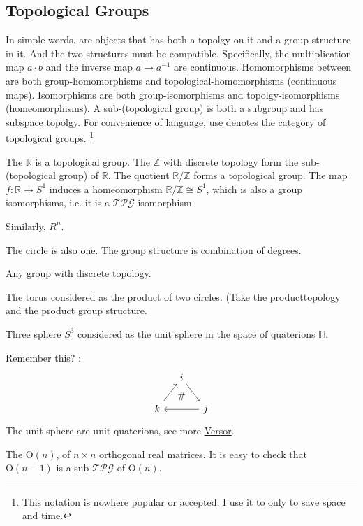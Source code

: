 \subsection{Topological Groups}
\label{sec:Topological-Groups}

In simple words,  are objects that has both
a topolgy on it and a group structure in it. And the two structures
must be compatible. Specifically, the multiplication map $a\cdot b$
and the inverse map $a\to a^{-1}$ are continuous. Homomorphisms
between are both group-homomorphisms and topological-homomorphisms
(continuous maps). Isomorphisms are both group-isomorphisms and
topolgy-isomorphisms (homeomorphisms). A sub-(topological group) is
both a subgroup and has subspace topolgy. For convenience of language,
use  denotes the category of topological groups.
\footnote{This notation is nowhere popular or accepted. I use it to
only to save space and time.}
\begin{ex}
    The $\mathbb{R}$ is a topological group. 
    The $\mathbb{Z}$ with discrete topology form the sub-(topological
    group) of $\mathbb{R}$. The quotient $\mathbb{R}/\mathbb{Z}$ forms
    a topological group. The map $f: \mathbb{R}\to S^1$ induces a
    homeomorphism $\mathbb{R}/\mathbb{Z} \cong S^1$, which is also a
    group isomorphisms, i.e. it is a $\mathcal{TPG}$-isomorphism.
\end{ex}
\begin{ex}
    Similarly, $R^n$.
\end{ex}

\begin{ex}
    The circle is also one. The group structure is combination of
    degrees.
\end{ex}
\begin{ex}
    Any group with discrete topology.
\end{ex}
\begin{ex}
    The torus considered as the product of two circles. (Take the
    producttopology and the product group structure.
\end{ex}
\begin{ex}
    Three sphere $S^3$ considered as the unit sphere in the space of
    quaterions $\mathbb{H}$.

    Remember this? :
    $$ \begin{tikzcd}[column sep=small]
        & i\ar[dr] &  \, \\
    k \ar[ur] &
    \ar[u,phantom, "\#"] 
    & j\ar[ll]
    \end{tikzcd} $$
    The unit sphere are unit quaterions, see more
    \href{https://en.wikipedia.org/wiki/Versor}{Versor}.
\end{ex}
\begin{ex}
    The  $\mathrm{O}(n)$, of $n\times n$
    orthogonal real matrices. It is easy to check that
    $\mathrm{O}(n-1)$ is a sub-$\mathcal{TPG}$ of $\mathrm{O}(n)$.
\end{ex}

